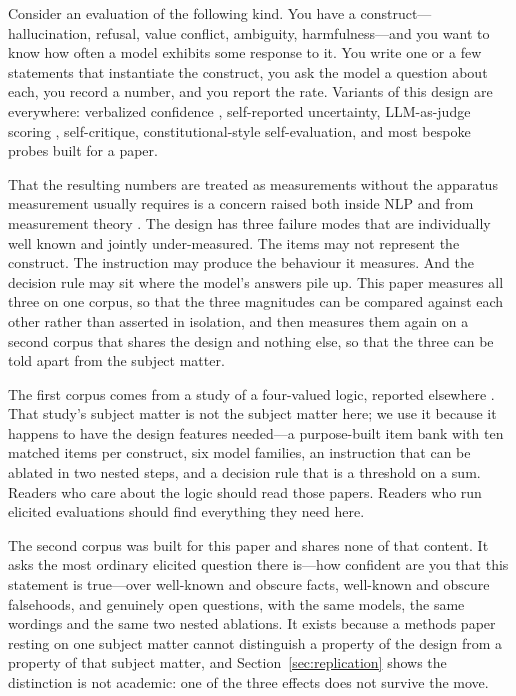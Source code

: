 \documentclass[11pt,letterpaper]{article}
\begin{document}
Consider an evaluation of the following kind. You have a construct---hallucination, refusal,
value conflict, ambiguity, harmfulness---and you want to know how often a model exhibits some
response to it. You write one or a few statements that instantiate the construct, you ask the
model a question about each, you record a number, and you report the rate. Variants of this
design are everywhere: verbalized confidence \citep{lin2022teaching}, self-reported
uncertainty, LLM-as-judge scoring \citep{zheng2023judging}, self-critique,
constitutional-style self-evaluation, and most bespoke probes built for a paper.

That the resulting numbers are treated as measurements without the apparatus measurement
usually requires is a concern raised both inside NLP \citep{bowmandahl2021} and from
measurement theory \citep{jacobs2021measurement}. The design has three failure modes that
are individually well known and jointly under-measured.
The items may not represent the construct. The instruction may produce the behaviour it
measures. And the decision rule may sit where the model's answers pile up. This paper measures
all three on one corpus, so that the three magnitudes can be compared against each other rather
than asserted in isolation, and then measures them again on a second corpus that shares the
design and nothing else, so that the three can be told apart from the subject matter.

The first corpus comes from a study of a four-valued logic, reported elsewhere
\citep{leyva2026ladder, leyva2026itembank}. That study's subject matter is not the subject
matter here; we use it because it happens to have the design features needed---a purpose-built
item bank with ten matched items per construct, six model families, an instruction that can be
ablated in two nested steps, and a decision rule that is a threshold on a sum. Readers who care
about the logic should read those papers. Readers who run elicited evaluations should find
everything they need here.

The second corpus was built for this paper and shares none of that content. It asks the most
ordinary elicited question there is---how confident are you that this statement is
true---over well-known and obscure facts, well-known and obscure falsehoods, and genuinely open
questions, with the same models, the same wordings and the same two nested ablations. It exists
because a methods paper resting on one subject matter cannot distinguish a property of the design
from a property of that subject matter, and Section~\ref{sec:replication} shows the distinction
is not academic: one of the three effects does not survive the move.
\end{document}
